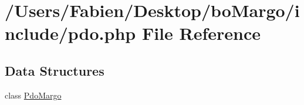 \hypertarget{pdo_8php}{}\section{/\+Users/\+Fabien/\+Desktop/bo\+Margo/include/pdo.php File Reference}
\label{pdo_8php}
\subsection*{Data Structures}
\begin{DoxyCompactItemize}
\item 
class \hyperlink{class_pdo_margo}{Pdo\+Margo}
\end{DoxyCompactItemize}
